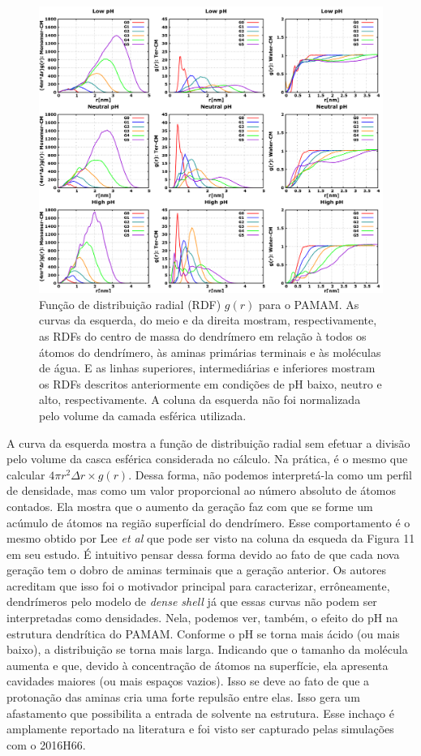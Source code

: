 \begin{figure}[ht!]
\centering
\includegraphics[width=\textwidth]{images/PAMAMRDF.png}
\caption{Função de distribuição radial (RDF) $g(r)$ para o PAMAM. As curvas da esquerda, do meio e da direita mostram, respectivamente, as RDFs do centro de massa do dendrímero em relação à todos os átomos do dendrímero, às aminas primárias terminais e às moléculas de água. E as linhas superiores, intermediárias e inferiores mostram os RDFs descritos anteriormente em condições de pH baixo, neutro e alto, respectivamente. A coluna da esquerda não foi normalizada pelo volume da camada esférica utilizada.}
\label{fig:PAMAMRDF}
\end{figure}

A curva da esquerda mostra a função de distribuição radial sem efetuar a divisão pelo volume da casca esférica considerada no cálculo. Na prática, é o mesmo que calcular $4\pi r^2 \Delta r \times g(r)$.
Dessa forma, não podemos interpretá-la como um perfil de densidade, mas como um valor proporcional ao número absoluto de átomos contados. 
Ela mostra que o aumento da geração faz com que se forme um acúmulo de átomos na região superfícial do dendrímero.
Esse comportamento é o mesmo obtido por Lee \textit{et al}\cite{Lee2002} que pode ser visto na coluna da esqueda da Figura 11 em seu estudo.
É intuitivo pensar dessa forma devido ao fato de que cada nova geração tem o dobro de aminas terminais que a geração anterior. 
Os autores acreditam que isso foi o motivador principal para caracterizar, errôneamente, dendrímeros pelo modelo de \textit{dense shell} já que essas curvas não podem ser interpretadas como densidades.
Nela, podemos ver, também, o efeito do pH na estrutura dendrítica do PAMAM.
Conforme o pH se torna mais ácido (ou mais baixo), a distribuição se torna mais larga.
Indicando que o tamanho da molécula aumenta e que, devido à concentração de átomos na superfície, ela apresenta cavidades maiores (ou mais espaços vazios).
Isso se deve ao fato de que a protonação das aminas cria uma forte repulsão entre elas. Isso gera um afastamento que possibilita a entrada de solvente na estrutura.
Esse inchaço é amplamente reportado na literatura e foi visto ser capturado pelas simulações com o 2016H66\cite{Horta2016}.
 
